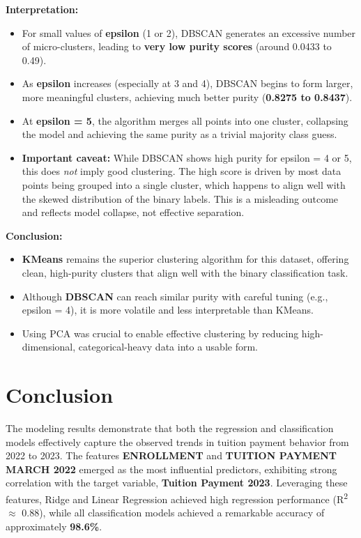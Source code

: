 \documentclass{article}
\begin{document}
\textbf{Interpretation:}
\begin{itemize}
    \item For small values of \textbf{epsilon} (1 or 2), DBSCAN generates an excessive number of micro-clusters, leading to \textbf{very low purity scores} (around 0.0433 to 0.49).
    \item As \textbf{epsilon} increases (especially at 3 and 4), DBSCAN begins to form larger, more meaningful clusters, achieving much better purity (\textbf{0.8275 to 0.8437}).
    \item At \textbf{epsilon = 5}, the algorithm merges all points into one cluster, collapsing the model and achieving the same purity as a trivial majority class guess.
    \item \textbf{Important caveat:} While DBSCAN shows high purity for epsilon = 4 or 5, this does \textit{not} imply good clustering. The high score is driven by most data points being grouped into a single cluster, which happens to align well with the skewed distribution of the binary labels. This is a misleading outcome and reflects model collapse, not effective separation.
\end{itemize}

\textbf{Conclusion:}
\begin{itemize}
    \item \textbf{KMeans} remains the superior clustering algorithm for this dataset, offering clean, high-purity clusters that align well with the binary classification task.
    \item Although \textbf{DBSCAN} can reach similar purity with careful tuning (e.g., epsilon = 4), it is more volatile and less interpretable than KMeans.
    \item Using PCA was crucial to enable effective clustering by reducing high-dimensional, categorical-heavy data into a usable form.
\end{itemize}



\section{Conclusion}

The modeling results demonstrate that both the regression and classification models effectively capture the observed trends in tuition payment behavior from 2022 to 2023. The features \textbf{ENROLLMENT} and \textbf{TUITION PAYMENT MARCH 2022} emerged as the most influential predictors, exhibiting strong correlation with the target variable, \textbf{Tuition Payment 2023}. Leveraging these features, Ridge and Linear Regression achieved high regression performance (R\textsuperscript{2} $\approx$ 0.88), while all classification models achieved a remarkable accuracy of approximately \textbf{98.6\%}.
\end{document}
